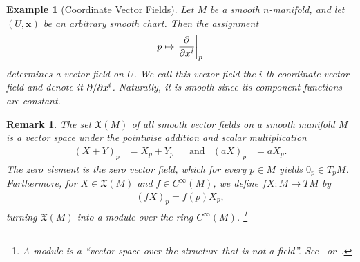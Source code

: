 \documentclass[11pt,a4paper,twoside,openany]{report}
\theoremstyle{my-theorem}
\theoremstyle{non-theorem}
\newtheorem{remark}[theorem]{Remark}
\newtheorem{example}[theorem]{Example}
\begin{document}
		\begin{example}[Coordinate Vector Fields]
			Let $M$ be a smooth $n$-manifold, and let $(U,\mathbf x)$ be an arbitrary smooth chart. Then the assignment
			\begin{align*}
				p \mapsto \left. \frac{\partial}{\partial x^i} \right|_p
			\end{align*}
			determines a vector field on $U$. We call this vector field the \emph{$i$-th coordinate vector field} and denote it $\partial/\partial x^i$. Naturally, it is smooth since its component functions are constant.
		\end{example}
		
		\begin{remark}
			\label{remark:set-of-all-vector-fields-forms-a-module}
			The set $\mathfrak X(M)$ of all smooth vector fields on a smooth manifold $M$ is a vector space under the pointwise addition and scalar multiplication
			\begin{align*}
				(X + Y)_p &= X_p + Y_p
			&
				&\text{and}
			&
				(aX)_p &= aX_p.
			\end{align*}
			The zero element is the zero vector field, which for every $p \in M$ yields $0_p \in T_p M$. Furthermore, for $X \in \mathfrak X(M)$ and $f \in C^\infty(M)$, we define $fX: M \to TM$ by
			\begin{align*}
				(fX)_p = f(p)X_p,
			\end{align*}
			turning $\mathfrak X(M)$ into a module over the ring $C^\infty(M)$.%
				\footnote{A module is a ``vector space over the structure that is not a field''. See~\cite{szilasi-kertesz-lovas:connections-sprays-and-finsler-structures} or~\cite{lee:manifolds-and-differential-geometry}.}
		\end{remark}
		
\end{document}
